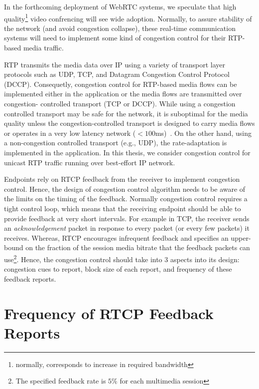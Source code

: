 In the forthcoming deployment of WebRTC systems, we speculate that high
quality\footnote{normally, corresponds to increase in required bandwidth}
video confrencing will see wide adoption. Normally, to assure stability of the
network (and avoid congestion collapse), these real-time communication systems
will need to implement some kind of congestion control for their RTP-based
media traffic.

RTP transmits the media data over IP using a variety of transport layer
protocols such as UDP, TCP, and Datagram Congestion Control Protocol (DCCP).
Consequetly, congestion control for RTP-based media flows can be implemented
either in the application or the media flows are transmitted over congestion-%
controlled transport (TCP or DCCP). While using a congestion controlled
transport may be safe for the network, it is suboptimal for the media quality
unless the congestion-controlled transport is designed to carry media flows or
operates in a very low latency network ($<100$ms)~\cite{Brosh:tcp-real-time}.
On the other hand, using a non-congestion controlled transport (e.g., UDP),
the rate-adaptation is implemented in the application.  In this thesis, we
consider congestion control for unicast RTP traffic running over best-effort
IP network.


Endpoints rely on RTCP feedback from the receiver to implement congestion
control. Hence, the design of congestion control algorithm needs to be aware
of the limits on the timing of the feedback. Normally congestion control
requires a tight control loop, which means that the receiving endpoint should
be able to provide feedback at very short intervals. For example in TCP, the
receiver sends an \emph{acknowledgement} packet in response to every packet
(or every few packets) it receives. Whereas, RTCP encourages infrequent
feedback and specifies an upper-bound on the fraction of the session media
bitrate that the feedback packets can use\footnote{The specified feedback rate
is $5\%$ for each multimedia session}. Hence, the congestion control should
take into 3 aspects into its design: congestion cues to report, block size of
each report, and frequency of these feedback reports.

\section{Frequency of RTCP Feedback Reports}

